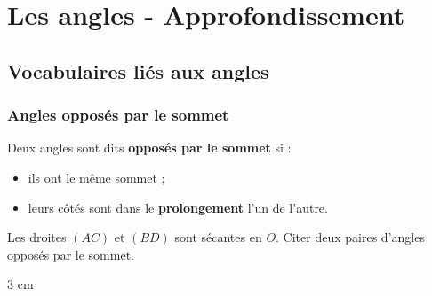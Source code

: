 \documentclass[a4paper]{book}
\begin{document}
\setcounter{chapter}{10} 
\renewcommand{\monTitre}{Les angles - Approfondissement}
\chapter{\monTitre}
\thispagestyle{fancy}


\section{Vocabulaires liés aux angles}
\subsection{Angles opposés par le sommet}

    
    \begin{definition}
        Deux angles sont dits \textbf{opposés par le sommet} si :
        \begin{itemize}
            \item ils ont le même sommet ;
            \item leurs côtés sont dans le \textbf{prolongement} l'un de l'autre.
        \end{itemize}
    \end{definition}
    
    
    \begin{exemple}
        \begin{minipage}{0.5\linewidth}
            Les droites $(AC)$ et $(BD)$ sont sécantes en $O$. Citer deux paires d'angles opposés par le sommet.
            \begin{ZoneReponse}{3 cm}
            \end{ZoneReponse}
        \end{minipage}
        \hfill
        \begin{minipage}{0.49\linewidth}
            \begin{center}
            \end{center}
        \end{minipage}
    \end{exemple}
    
\end{document}
